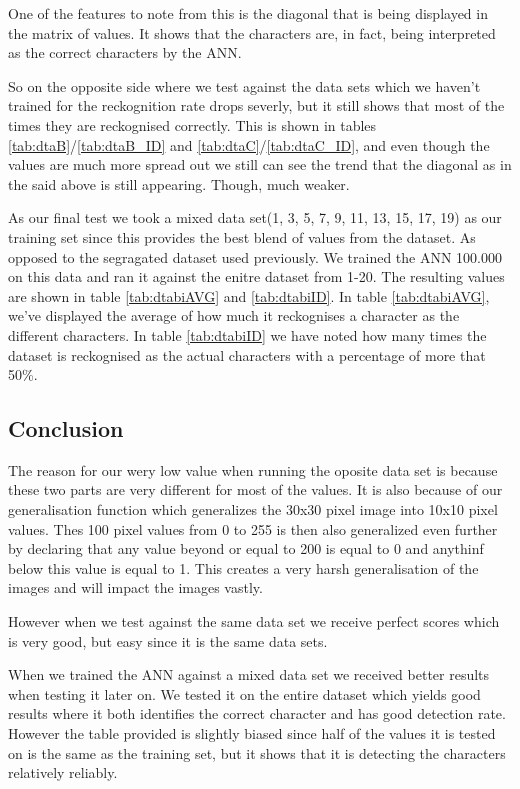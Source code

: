 One of the features to note from this is the diagonal that is being displayed in
the matrix of values.  It shows that the characters are, in fact, being
interpreted as the correct characters by the ANN.

So on the opposite side where we test against the data sets which we haven't
trained for the reckognition rate drops severly, but it still shows that most of
the times they are reckognised correctly.  This is shown in tables 
\ref{tab:dtaB}/\ref{tab:dtaB_ID} and \ref{tab:dtaC}/\ref{tab:dtaC_ID}, and even
though the values are much more spread out we still can see the trend that the
diagonal as in the said above is still appearing. Though, much weaker.

As our final test we took a mixed data set(1, 3, 5, 7, 9, 11, 13, 15, 17, 19) as
our training set since this provides the best blend of values from the dataset.
As opposed to the segragated dataset used previously.  We trained the ANN
100.000 on this data and ran it against the enitre dataset from 1-20.  The
resulting values are shown in table \ref{tab:dtabiAVG} and \ref{tab:dtabiID}.
In table \ref{tab:dtabiAVG}, we've displayed the average of how much it
reckognises a character as the different characters. In table \ref{tab:dtabiID}
we have noted how many times the dataset is reckognised as the actual characters
with a percentage of more that 50\%.


\subsection{Conclusion}
The reason for our wery low value when running the oposite data set is because
these two parts are very different for most of the values.  It is also because
of our generalisation function which generalizes the 30x30 pixel image into
10x10 pixel values. Thes 100 pixel values from 0 to 255 is then also generalized
even further by declaring that any value beyond or equal to 200 is equal to 0
and anythinf below this value is equal to 1.  This creates a very harsh
generalisation of the images and will impact the images vastly.

However when we test against the same data set we receive perfect scores which
is very good, but easy since it is the same data sets.

When we trained the ANN against a mixed data set we received better results when
testing it later on. We tested it on the entire dataset which yields good
results where it both identifies the correct character and has good detection
rate.  However the table provided is slightly biased since half of the values
it is tested on is the same as the training set, but it shows that it is
detecting the characters relatively reliably.

